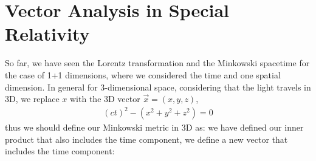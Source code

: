 \section{Vector Analysis in Special Relativity}
So far, we have seen the Lorentz transformation and the Minkowski spacetime for the case of 1+1 dimensions, where we considered the time and one spatial dimension.
In general for $3$-dimensional space, considering that the light travels in 3D, we replace $x$ with the 3D vector $\vec{x} = (x, y, z)$,
\begin{align}
  (ct)^2 - (x^2 + y^2 + z^2) = 0
\end{align}
thus we should define our Minkowski metric in 3D as:
we have defined our inner product that also includes the time component, we define a new vector that includes the time component:
